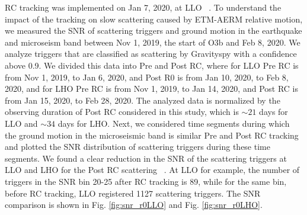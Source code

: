 \documentclass[12pt]{iopart}
\begin{document}
RC tracking was implemented on Jan 7, 2020, at LLO ~\cite{alog_anamaria}. To understand the impact of the tracking on slow scattering caused by ETM-AERM relative motion, we measured the SNR of scattering triggers and ground motion in the earthquake and microseism band between Nov 1, 2019, the start of O3b and Feb 8, 2020. We analyze triggers that are classified as scattering by Gravityspy with a confidence above 0.9. We divided this data into Pre and Post RC, where for LLO Pre RC is from Nov 1, 2019, to Jan 6, 2020, and Post R0 is from Jan 10, 2020, to Feb 8, 2020, and for LHO Pre RC is from Nov 1, 2019, to Jan 14, 2020, and Post RC is from Jan 15, 2020, to Feb 28, 2020. The analyzed data is normalized by the observing duration of Post RC considered in this study, which is $\sim 21$ days for LLO and $\sim 34$ days for LHO. Next, we considered time segments during which the ground motion in the microseismic band is similar Pre and Post RC tracking and plotted the SNR distribution of scattering triggers during these time segments. We found a clear reduction in the SNR of the scattering triggers at LLO and LHO for the Post RC scattering ~\cite{alogsid_R0}. At LLO for example, the number of triggers in the SNR bin 20-25 after RC tracking is 89, while for the same bin, before RC tracking, LLO registered 1127 scattering triggers. The SNR comparison is shown in Fig. \ref{fig:snr_r0LLO}  and Fig. \ref{fig:snr_r0LHO}.
\end{document}
